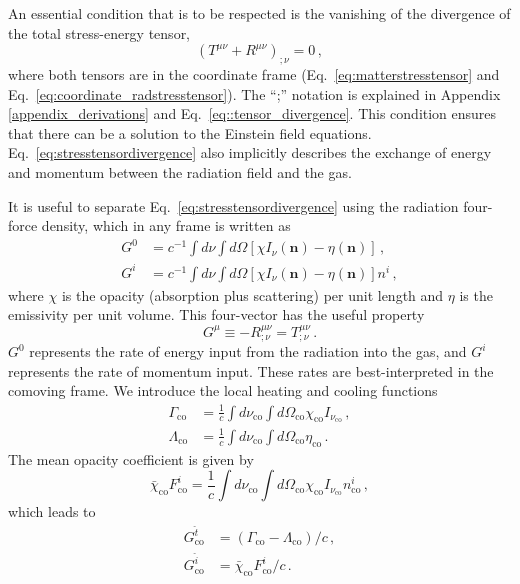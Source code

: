 \documentclass[../main.tex]{subfiles}
\begin{document}
An essential condition that is to be respected is the vanishing of the divergence of the total stress-energy tensor,
\begin{equation}\label{eq:stresstensordivergence}
    (T^{\mu\nu}+R^{\mu\nu})_{;\nu}=0\,,
\end{equation}
where both tensors are in the coordinate frame (Eq.~\ref{eq:matterstresstensor} and Eq.~\ref{eq:coordinate_radstresstensor}). The ``;'' notation is explained in Appendix \ref{appendix_derivations} and Eq.~\eqref{eq::tensor_divergence}. This condition ensures that there can be a solution to the Einstein field equations.  Eq.~\eqref{eq:stresstensordivergence} also implicitly describes the exchange of energy and momentum between the radiation field and the gas. 

It is useful to separate Eq.~\eqref{eq:stresstensordivergence} using the radiation four-force density, which in any frame is written as \citep{MihalasMihalas1984}
\begin{align}
    G^0&=c^{-1}\int d\nu\int d\Omega[\chi I_\nu(\bm{n})-\eta(\bm{n})]\,,\\ 
    G^i&=c^{-1}\int d\nu\int d\Omega[\chi I_\nu(\bm{n})-\eta(\bm{n})]n^i\,,
\end{align}
where $\chi$ is the opacity (absorption plus scattering) per unit length and $\eta$ is the emissivity per unit volume. This four-vector has the useful property
\begin{equation}
    G^\mu\equiv -R^{\mu\nu}_{;\nu}=T^{\mu\nu}_{;\nu}\,.
\end{equation}
$G^0$ represents the rate of energy input from the radiation into the gas, and $G^i$ represents the rate of momentum input.  These rates are best-interpreted in the comoving frame. We introduce the local heating and cooling functions
\begin{align}
    \Gamma_\text{co}&=\frac{1}{c}\int d\nu_\text{co}\int d\Omega_\text{co}\chi_\text{co}I_{\nu_\text{co}}\,,\\
    \Lambda_\text{co}&=\frac{1}{c}\int d\nu_\text{co}\int d\Omega_\text{co}\eta_\text{co}\,.
\end{align}
 The mean opacity coefficient is given by
\begin{equation}
    \bar{\chi}_\text{co}F^i_\text{co}=\frac{1}{c}\int d\nu_\text{co}\int d\Omega_\text{co}\chi_\text{co}I_{\nu_\text{co}}n^i_\text{co}\,,
\end{equation}
which leads to
\begin{align}
    G^{\hat{t}}_\text{co}&=(\Gamma_\text{co}-\Lambda_\text{co})/c\,,\label{eq:G_co^t}\\
    G^{\hat{i}}_\text{co}&=\bar{\chi}_\text{co}F^i_\text{co}/c \,.\label{eq:G_co^i}
\end{align}
\end{document}
